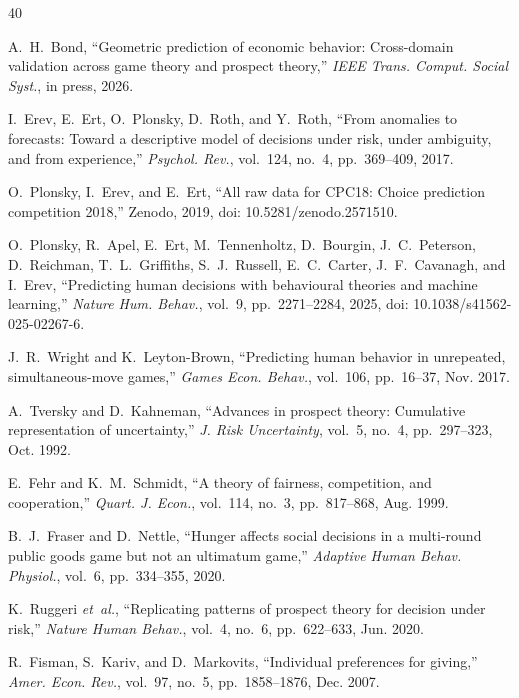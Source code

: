 \documentclass[journal]{IEEEtran}
\begin{document}
\begin{thebibliography}{40}

A.~H.~Bond, ``Geometric prediction of economic behavior: Cross-domain validation across game theory and prospect theory,''
\emph{IEEE Trans. Comput. Social Syst.}, in press, 2026.

I.~Erev, E.~Ert, O.~Plonsky, D.~Roth, and Y.~Roth, ``From anomalies to forecasts: Toward a descriptive model of decisions under risk, under ambiguity, and from experience,''
\emph{Psychol. Rev.}, vol.~124, no.~4, pp.~369--409, 2017.

O.~Plonsky, I.~Erev, and E.~Ert, ``All raw data for CPC18: Choice prediction competition 2018,''
Zenodo, 2019, doi: 10.5281/zenodo.2571510.

O.~Plonsky, R.~Apel, E.~Ert, M.~Tennenholtz, D.~Bourgin, J.~C.~Peterson, D.~Reichman,
T.~L.~Griffiths, S.~J.~Russell, E.~C.~Carter, J.~F.~Cavanagh, and I.~Erev, ``Predicting human
decisions with behavioural theories and machine learning,'' \emph{Nature Hum. Behav.},
vol.~9, pp.~2271--2284, 2025, doi: 10.1038/s41562-025-02267-6.

J.~R.~Wright and K.~Leyton-Brown, ``Predicting human behavior in unrepeated, simultaneous-move games,''
\emph{Games Econ. Behav.}, vol.~106, pp.~16--37, Nov. 2017.

A.~Tversky and D.~Kahneman, ``Advances in prospect theory: Cumulative representation of uncertainty,''
\emph{J. Risk Uncertainty}, vol.~5, no.~4, pp.~297--323, Oct. 1992.

E.~Fehr and K.~M.~Schmidt, ``A theory of fairness, competition, and cooperation,''
\emph{Quart. J. Econ.}, vol.~114, no.~3, pp.~817--868, Aug. 1999.

B.~J.~Fraser and D.~Nettle, ``Hunger affects social decisions in a multi-round public goods game but not an ultimatum game,''
\emph{Adaptive Human Behav. Physiol.}, vol.~6, pp.~334--355, 2020.

K.~Ruggeri \emph{et~al.}, ``Replicating patterns of prospect theory for decision under risk,''
\emph{Nature Human Behav.}, vol.~4, no.~6, pp.~622--633, Jun. 2020.

R.~Fisman, S.~Kariv, and D.~Markovits, ``Individual preferences for giving,''
\emph{Amer. Econ. Rev.}, vol.~97, no.~5, pp.~1858--1876, Dec. 2007.


\end{thebibliography}
\end{document}
